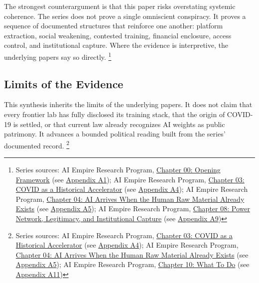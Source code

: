 \documentclass[
  american,
  11pt,
  letterpaper,
]{article}
\begin{document}
The strongest counterargument is that this paper risks overstating
systemic coherence. The series does not prove a single omniscient
conspiracy. It proves a sequence of documented structures that reinforce
one another: platform extraction, social weakening, contested training,
financial enclosure, access control, and institutional capture. Where
the evidence is interpretive, the underlying papers say so directly.
\footnote{Series sources: AI Empire Research Program,
  \href{00_opening-framework_paper.html}{Chapter 00: Opening Framework}
  (see \hyperref[appendix-a1-chapter-00-opening-framework]{Appendix
  A1}); AI Empire Research Program,
  \href{03_covid-historical-accelerator_paper.html}{Chapter 03: COVID as
  a Historical Accelerator} (see
  \hyperref[appendix-a4-chapter-03-covid-as-a-historical-accelerator]{Appendix
  A4}); AI Empire Research Program,
  \href{04_data-models-weights_paper.html}{Chapter 04: AI Arrives When
  the Human Raw Material Already Exists} (see
  \hyperref[appendix-a5-chapter-04-ai-arrives-when-the-human-raw-material-already-exists]{Appendix
  A5}); AI Empire Research Program,
  \href{08_legitimacy-and-institutional-capture_paper.html}{Chapter 08:
  Power Network, Legitimacy, and Institutional Capture} (see
  \hyperref[appendix-a9-chapter-08-power-network-legitimacy-and-institutional-capture]{Appendix
  A9})}

\subsection{Limits of the Evidence}\label{limits-of-the-evidence}

This synthesis inherits the limits of the underlying papers. It does not
claim that every frontier lab has fully disclosed its training stack,
that the origin of COVID-19 is settled, or that current law already
recognizes AI weights as public patrimony. It advances a bounded
political reading built from the series' documented record. \footnote{Series
  sources: AI Empire Research Program,
  \href{03_covid-historical-accelerator_paper.html}{Chapter 03: COVID as
  a Historical Accelerator} (see
  \hyperref[appendix-a4-chapter-03-covid-as-a-historical-accelerator]{Appendix
  A4}); AI Empire Research Program,
  \href{04_data-models-weights_paper.html}{Chapter 04: AI Arrives When
  the Human Raw Material Already Exists} (see
  \hyperref[appendix-a5-chapter-04-ai-arrives-when-the-human-raw-material-already-exists]{Appendix
  A5}); AI Empire Research Program,
  \href{10_three-reform-program_paper.html}{Chapter 10: What To Do} (see
  \hyperref[appendix-a11-chapter-10-what-to-do]{Appendix A11})}
\end{document}
